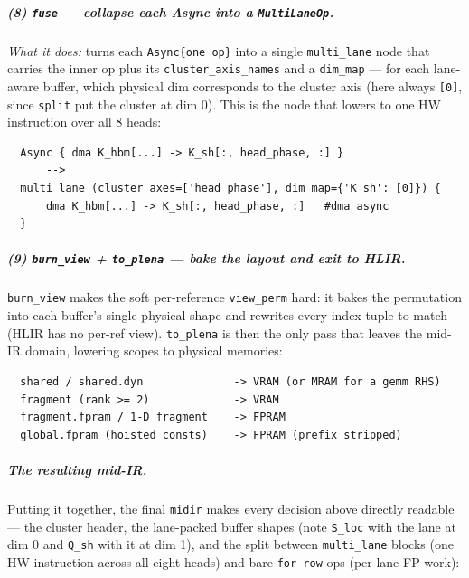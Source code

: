 \documentclass[
  10pt,
]{article}
\begin{document}
\subparagraph{(8) \texttt{fuse} --- collapse each Async into a
\texttt{MultiLaneOp}.}\label{fa-fuse} \emph{What it does:} turns each
\texttt{Async\{one op\}} into a single \texttt{multi\_lane} node that
carries the inner op plus its \texttt{cluster\_axis\_names} and a
\texttt{dim\_map} --- for each lane-aware buffer, which physical dim
corresponds to the cluster axis (here always \texttt{[0]}, since
\texttt{split} put the cluster at dim 0). This is the node that lowers to
one HW instruction over all 8 heads:

\begin{verbatim}
  Async { dma K_hbm[...] -> K_sh[:, head_phase, :] }
      -->
  multi_lane (cluster_axes=['head_phase'], dim_map={'K_sh': [0]}) {
      dma K_hbm[...] -> K_sh[:, head_phase, :]   #dma async
  }
\end{verbatim}

\subparagraph{(9) \texttt{burn\_view} + \texttt{to\_plena} --- bake the
layout and exit to HLIR.}\label{fa-burn} \texttt{burn\_view} makes the
soft per-reference \texttt{view\_perm} hard: it bakes the permutation
into each buffer's single physical shape and rewrites every index tuple
to match (HLIR has no per-ref view). \texttt{to\_plena} is then the only
pass that leaves the mid-IR domain, lowering scopes to physical memories:

\begin{verbatim}
  shared / shared.dyn              -> VRAM (or MRAM for a gemm RHS)
  fragment (rank >= 2)             -> VRAM
  fragment.fpram / 1-D fragment    -> FPRAM
  global.fpram (hoisted consts)    -> FPRAM (prefix stripped)
\end{verbatim}

\subparagraph{The resulting mid-IR.}\label{fa-result} Putting it
together, the final \texttt{midir} makes every decision above directly
readable --- the cluster header, the lane-packed buffer shapes (note
\texttt{S\_loc} with the lane at dim 0 and \texttt{Q\_sh} with it at dim
1), and the split between \texttt{multi\_lane} blocks (one HW instruction
across all eight heads) and bare \texttt{for row} ops (per-lane FP work):
\end{document}
